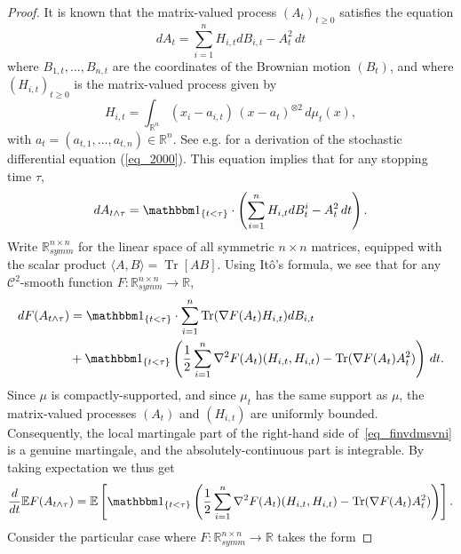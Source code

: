 \documentclass[12pt,a4paper]{article}
\newcommand{\Tr}{\mathop{\mathrm{Tr}}\nolimits}
\newcommand{\tr}{\mathop{\mathrm{Tr}}\nolimits}
\newcommand{\E}{\mathbb{E}}
\newcommand{\RR}{\mathbb{R}}
\newcommand{\R}{\mathbb{R}}
\theoremstyle{definition}
\begin{document}
\begin{proof}
It is known that the matrix-valued process $(A_t)_{t \geq 0}$ satisfies the equation 
\begin{equation} 
d A_t =  \sum_{i=1}^n H_{i,t} d B_{i,t} - A_t^2 \, dt
\label{eq_2000} \end{equation}
where $B_{1,t},\dotsc,B_{n,t}$ are the coordinates of the
Brownian motion $(B_t)$, and where $(H_{i,t})_{t \geq 0}$ is the matrix-valued process given by
\begin{equation}\label{eq_4701}
H_{i,t} = \int_{\R^n} (x_i-a_{i,t} ) \, (x-a_t)^{\otimes 2} \, d \mu_t(x),
\end{equation}
with $a_t = (a_{t,1},\ldots, a_{t,n}) \in \RR^n$. See e.g. \cite[section 7]{KLbull} for a derivation of 
the stochastic differential equation (\ref{eq_2000}). This equation implies that for any stopping time $\tau$,
\[
d A_{t\wedge \tau} =  \mathbbm 1_{\{t<\tau\}} \cdot \left(
\sum_{i=1}^n H_{i,t} d B^i_t - A_t^2 \, dt \right).
\]
Write $\RR^{n \times n}_{symm}$ for the linear space of all symmetric
$n \times n$ matrices, equipped with the scalar product $\langle A, B \rangle = \tr[AB]$. Using It\^o's formula, we see that for any
$\mathcal C^2$-smooth function $F: \RR^{n \times n}_{symm} \rightarrow \RR$,
\begin{equation}\label{eq_finvdmsvni}
\begin{split}
d F(A_{t\wedge\tau})
& = \mathbbm 1_{\{t<\tau\}} \cdot  \sum_{i=1}^n \Tr ( \nabla F ( A_t ) H_{i,t} ) d B_{i,t}  \\
& + \mathbbm 1_{\{t<\tau\}} \left(
\frac12 \sum_{i=1}^n \nabla^2 F(A_t) ( H_{i,t}, H_{i,t} )
- \Tr ( \nabla F (A_t) A_t^2 )  \right) \, dt.
\end{split}
\end{equation}
Since $\mu$ is compactly-supported, and since $\mu_t$ has the same support
as $\mu$, the matrix-valued processes $(A_t)$ and $(H_{i,t})$ are uniformly bounded. 
Consequently, the local martingale part of the right-hand side of~\eqref{eq_finvdmsvni} is a genuine martingale, and the
absolutely-continuous part is integrable. By taking expectation
we thus get
\begin{equation}\label{eq_vfdlmhhguelti}
\frac{d}{dt} \E F(A_{t\wedge\tau})
= \E \left[ \mathbbm 1_{\{t<\tau\}} \left( \frac12 \sum_{i=1}^n  \nabla^2 F(A_t) ( H_{i,t}, H_{i,t} ) -  \Tr ( \nabla F (A_t) A_t^2 ) \right)  \right] .
\end{equation}
Consider the particular case where $F: \RR^{n \times n}_{symm} \rightarrow \RR$ takes the form

\end{proof}
\end{document}
